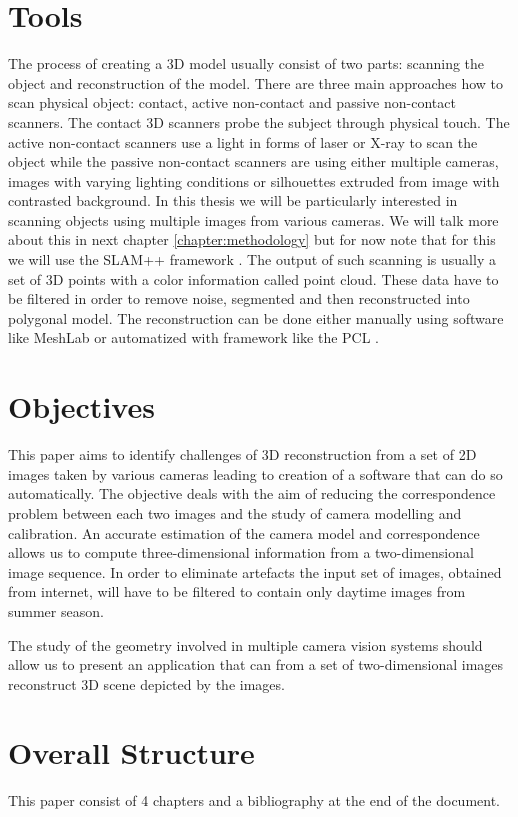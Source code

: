 \section{Tools}
The process of creating a 3D model usually consist of two parts: scanning the object and reconstruction of the model. There are three main approaches how to scan physical object: contact, active non-contact  and passive non-contact scanners. The contact 3D scanners probe the subject through physical touch. The active non-contact scanners use a light in forms of laser or X-ray to scan the object while the passive non-contact scanners are using either multiple cameras, images with varying lighting conditions or silhouettes extruded from image with contrasted background. In this thesis we will be particularly interested in scanning objects using multiple images from various cameras. We will talk more about this in next chapter \ref{chapter:methodology} but for now note that for this we will use the SLAM++ framework \cite{www:slam}. The output of such scanning is usually a set of 3D points with a color information called point cloud. These data have to be filtered in order to remove noise, segmented and then reconstructed into polygonal model. The reconstruction can be done either manually using software like MeshLab \cite{www:meshlab} or automatized with framework like the PCL \cite{www:pcl}. 

\section{Objectives}
This paper aims to identify challenges of 3D reconstruction from a set of 2D images taken by various cameras leading to creation of a software that can do so automatically. The objective deals with the aim of reducing the correspondence problem between each two images and the study of camera modelling and calibration. An accurate estimation of the camera model and correspondence allows us to compute three-dimensional information from a two-dimensional image sequence. In order to eliminate artefacts the input set of images, obtained from internet, will have to be filtered to contain only daytime images from summer season.

The study of the geometry involved in multiple camera vision systems should allow us to present an application that can from a set of two-dimensional images reconstruct 3D scene depicted by the images.

\section{Overall Structure}
This paper consist of 4 chapters and a bibliography at the end of the document.

